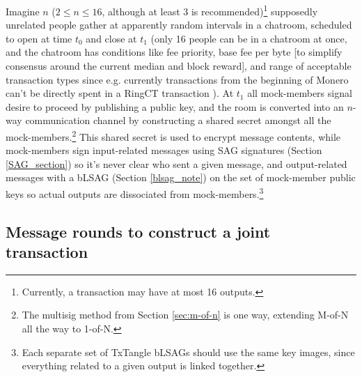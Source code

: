 Imagine $n$ ($2 \leq n \leq 16$, although at least 3 is recommended)\footnote{Currently, a transaction may have at most 16 outputs.} supposedly unrelated people gather at apparently random intervals in a chatroom, scheduled to open at time $t_0$ and close at $t_1$ (only 16 people can be in a chatroom at once, and the chatroom has conditions like fee priority, base fee per byte [to simplify consensus around the current median and block reward], and range of acceptable transaction types since e.g. currently transactions from the beginning of Monero can't be directly spent in a RingCT transaction \cite{pre-ringct-outputs-like-coinbase-research-issue-59}). At $t_1$ all mock-members signal desire to proceed by publishing a public key, and the room is converted into an $n$-way communication channel by constructing a shared secret amongst all the mock-members.\footnote{The multisig method from Section \ref{sec:m-of-n} is one way, extending M-of-N all the way to 1-of-N.} This shared secret is used to encrypt message contents, while mock-members sign input-related messages using SAG signatures (Section \ref{SAG_section}) so it's never clear who sent a given message, and output-related messages with a bLSAG (Section \ref{blsag_note}) on the set of mock-member public keys so actual outputs are dissociated from mock-members.\footnote{Each separate set of TxTangle bLSAGs should use the same key images, since everything related to a given output is linked together.}%


\subsection{Message rounds to construct a joint transaction}
\label{subsec:message-rounds-txtangle}

